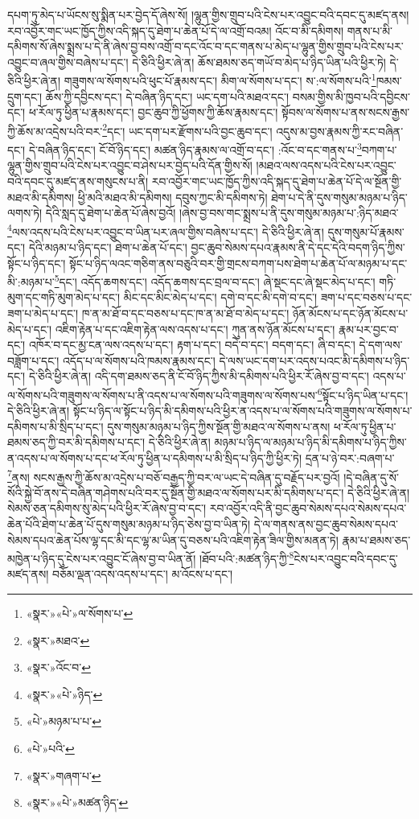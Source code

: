 དཔག་ཏུ་མེད་པ་ཡོངས་སུ་སྨིན་པར་བྱེད་དོ་ཞེས་སོ། །ལྷུན་གྱིས་གྲུབ་པའི་ངེས་པར་འབྱུང་བའི་དབང་དུ་མཛད་ནས། རབ་འབྱོར་གང་ཡང་ཁྱོད་ཀྱིས་འདི་སྐད་དུ་ཐེག་པ་ཆེན་པོ་དེ་ལ་འགྲོ་བའམ། འོང་བ་མི་དམིགས། གནས་པ་མི་དམིགས་སོ་ཞེས་སྨྲས་པ་དེ་ནི་ཞེས་བྱ་བས་འགྲོ་བ་དང་འོང་བ་དང་གནས་པ་མེད་པ་ལྷུན་གྱིས་གྲུབ་པའི་ངེས་པར་འབྱུང་བ་ཞལ་གྱིས་བཞེས་པ་དང་། དེ་ཅིའི་ཕྱིར་ཞེ་ན། ཆོས་ཐམས་ཅད་གཡོ་བ་མེད་པ་ཉིད་ཡིན་པའི་ཕྱིར་ཏེ། དེ་ཅིའི་ཕྱིར་ཞེ་ན། གཟུགས་ལ་སོགས་པའི་ཕུང་པོ་རྣམས་དང་། མིག་ལ་སོགས་པ་དང་། ས་:ལ་སོགས་པའི་\footnote{«སྣར་»«པེ་»ལ་སོགས་པ་}ཁམས་དྲུག་དང་། ཆོས་ཀྱི་དབྱིངས་དང་། དེ་བཞིན་ཉིད་དང་། ཡང་དག་པའི་མཐའ་དང་། བསམ་གྱིས་མི་ཁྱབ་པའི་དབྱིངས་དང་། ཕ་རོལ་ཏུ་ཕྱིན་པ་རྣམས་དང་། བྱང་ཆུབ་ཀྱི་ཕྱོགས་ཀྱི་ཆོས་རྣམས་དང་། སྟོབས་ལ་སོགས་པ་ནས་སངས་རྒྱས་ཀྱི་ཆོས་མ་འདྲེས་པའི་བར་\footnote{«སྣར་»མཐའ་}དང་། ཡང་དག་པར་རྫོགས་པའི་བྱང་ཆུབ་དང་། འདུས་མ་བྱས་རྣམས་ཀྱི་རང་བཞིན་དང་། དེ་བཞིན་ཉིད་དང་། ངོ་བོ་ཉིད་དང་། མཚན་ཉིད་རྣམས་ལ་འགྲོ་བ་དང་། :འོང་བ་དང་གནས་པ་\footnote{«སྣར་»འོང་བ་}བཀག་པ་ལྷུན་གྱིས་གྲུབ་པའི་ངེས་པར་འབྱུང་བ་ཤེས་པར་བྱེད་པའི་དོན་གྱིས་སོ། །མཐའ་ལས་འདས་པའི་ངེས་པར་འབྱུང་བའི་དབང་དུ་མཛད་ནས་གསུངས་པ་ནི། རབ་འབྱོར་གང་ཡང་ཁྱོད་ཀྱིས་འདི་སྐད་དུ་ཐེག་པ་ཆེན་པོ་དེ་ལ་སྔོན་གྱི་མཐའ་མི་དམིགས། ཕྱི་མའི་མཐའ་མི་དམིགས། དབུས་ཀྱང་མི་དམིགས་ཏེ། ཐེག་པ་དེ་ནི་དུས་གསུམ་མཉམ་པ་ཉིད་ལགས་ཏེ། དེའི་སླད་དུ་ཐེག་པ་ཆེན་པོ་ཞེས་བྱའོ། །ཞེས་བྱ་བས་གང་སྨྲས་པ་ནི་དུས་གསུམ་མཉམ་པ་:ཉིད་མཐའ་\footnote{«སྣར་»«པེ་»ཉིད་}ལས་འདས་པའི་ངེས་པར་འབྱུང་བ་ཡིན་པར་ཞལ་གྱིས་བཞེས་པ་དང་། དེ་ཅིའི་ཕྱིར་ཞེ་ན། དུས་གསུམ་པོ་རྣམས་དང་། དེའི་མཉམ་པ་ཉིད་དང་། ཐེག་པ་ཆེན་པོ་དང་། བྱང་ཆུབ་སེམས་དཔའ་རྣམས་ནི་དེ་དང་དེའི་བདག་ཉིད་ཀྱིས་སྟོང་པ་ཉིད་དང་། སྟོང་པ་ཉིད་ལའང་གཅིག་ནས་བཅུའི་བར་གྱི་གྲངས་བཀག་པས་ཐེག་པ་ཆེན་པོ་ལ་མཉམ་པ་དང་མི་:མཉམ་པ་\footnote{«པེ་»མཉམ་པ་པ་}དང་། འདོད་ཆགས་དང་། འདོད་ཆགས་དང་བྲལ་བ་དང་། ཞེ་སྡང་དང་ཞེ་སྡང་མེད་པ་དང་། གཏི་མུག་དང་གཏི་མུག་མེད་པ་དང་། མིང་དང་མིང་མེད་པ་དང་། དགེ་བ་དང་མི་དགེ་བ་དང་། ཟག་པ་དང་བཅས་པ་དང་ཟག་པ་མེད་པ་དང་། ཁ་ན་མ་ཐོ་བ་དང་བཅས་པ་དང་ཁ་ན་མ་ཐོ་བ་མེད་པ་དང་། ཉོན་མོངས་པ་དང་ཉོན་མོངས་པ་མེད་པ་དང་། འཇིག་རྟེན་པ་དང་འཇིག་རྟེན་ལས་འདས་པ་དང་། ཀུན་ནས་ཉོན་མོངས་པ་དང་། རྣམ་པར་བྱང་བ་དང་། འཁོར་བ་དང་མྱ་ངན་ལས་འདས་པ་དང་། རྟག་པ་དང་། བདེ་བ་དང་། བདག་དང་། ཞི་བ་དང་། དེ་དག་ལས་བཟློག་པ་དང་། འདོད་པ་ལ་སོགས་པའི་ཁམས་རྣམས་དང་། དེ་ལས་ཡང་དག་པར་འདས་པའང་མི་དམིགས་པ་ཉིད་དང་། དེ་ཅིའི་ཕྱིར་ཞེ་ན། འདི་དག་ཐམས་ཅད་ནི་ངོ་བོ་ཉིད་ཀྱིས་མི་དམིགས་པའི་ཕྱིར་རོ་ཞེས་བྱ་བ་དང་། འདས་པ་ལ་སོགས་པའི་གཟུགས་ལ་སོགས་པ་ནི་འདས་པ་ལ་སོགས་པའི་གཟུགས་ལ་སོགས་པས་\footnote{«པེ་»པའི་}སྟོང་པ་ཉིད་ཡིན་པ་དང་། དེ་ཅིའི་ཕྱིར་ཞེ་ན། སྟོང་པ་ཉིད་ལ་སྟོང་པ་ཉིད་མི་དམིགས་པའི་ཕྱིར་ན་འདས་པ་ལ་སོགས་པའི་གཟུགས་ལ་སོགས་པ་དམིགས་པ་མི་སྲིད་པ་དང་། དུས་གསུམ་མཉམ་པ་ཉིད་ཀྱིས་སྔོན་གྱི་མཐའ་ལ་སོགས་པ་ནས། ཕ་རོལ་ཏུ་ཕྱིན་པ་ཐམས་ཅད་ཀྱི་བར་མི་དམིགས་པ་དང་། དེ་ཅིའི་ཕྱིར་ཞེ་ན། མཉམ་པ་ཉིད་ལ་མཉམ་པ་ཉིད་མི་དམིགས་པ་ཉིད་ཀྱིས་ན་འདས་པ་ལ་སོགས་པ་དང་ཕ་རོལ་ཏུ་ཕྱིན་པ་དམིགས་པ་མི་སྲིད་པ་ཉིད་ཀྱི་ཕྱིར་ཏེ། དྲན་པ་ཉེ་བར་:བཞག་པ་\footnote{«སྣར་»གཞག་པ་}ནས། སངས་རྒྱས་ཀྱི་ཆོས་མ་འདྲེས་པ་བཅོ་བརྒྱད་ཀྱི་བར་ལ་ཡང་དེ་བཞིན་དུ་བརྗོད་པར་བྱའོ། །དེ་བཞིན་དུ་སོ་སོའི་སྐྱེ་བོ་ནས་དེ་བཞིན་གཤེགས་པའི་བར་དུ་སྔོན་གྱི་མཐའ་ལ་སོགས་པར་མི་དམིགས་པ་དང་། དེ་ཅིའི་ཕྱིར་ཞེ་ན། སེམས་ཅན་དམིགས་སུ་མེད་པའི་ཕྱིར་རོ་ཞེས་བྱ་བ་དང་། རབ་འབྱོར་འདི་ནི་བྱང་ཆུབ་སེམས་དཔའ་སེམས་དཔའ་ཆེན་པོའི་ཐེག་པ་ཆེན་པོ་དུས་གསུམ་མཉམ་པ་ཉིད་ཅེས་བྱ་བ་ཡིན་ཏེ། དེ་ལ་གནས་ནས་བྱང་ཆུབ་སེམས་དཔའ་སེམས་དཔའ་ཆེན་པོས་ལྷ་དང་མི་དང་ལྷ་མ་ཡིན་དུ་བཅས་པའི་འཇིག་རྟེན་ཟིལ་གྱིས་མནན་ཏེ། རྣམ་པ་ཐམས་ཅད་མཁྱེན་པ་ཉིད་དུ་ངེས་པར་འབྱུང་ངོ་ཞེས་བྱ་བ་ཡིན་ནོ། །ཐོབ་པའི་:མཚན་ཉིད་ཀྱི་\footnote{«སྣར་»«པེ་»མཚན་ཉིད་}ངེས་པར་འབྱུང་བའི་དབང་དུ་མཛད་ནས། བཅོམ་ལྡན་འདས་འདས་པ་དང་། མ་འོངས་པ་དང་། 